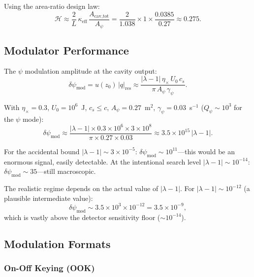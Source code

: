 \documentclass[11pt,letterpaper]{article}
\newcommand{\ee}[1]{\times 10^{#1}}
\newcommand{\psifield}{\psi}
\begin{document}
Using the area-ratio design law:
\begin{equation}
\mathcal{H} \approx \frac{2}{L}\,\kappa_\text{eff}\,
\frac{A_\text{cav,tot}}{A_\psi}
= \frac{2}{1.038}\times 1 \times \frac{0.0385}{0.27}
\approx 0.275.
\label{eq:H_value}
\end{equation}

\subsection{Modulator Performance}

The $\psifield$ modulation amplitude at the cavity output:
\begin{equation}
\delta\psifield_\text{mod} = u(z_0)\,|q|_\text{res}
\approx \frac{|\lambda-1|\,\eta_\times\,U_0\,c_s}
{\pi\,A_\psi\,\gamma_\psi}.
\label{eq:dpsi_mod}
\end{equation}

With $\eta_\times = 0.3$, $U_0 = 10^6$~J, $c_s \leq c$,
$A_\psi = 0.27$~m$^2$, $\gamma_\psi = 0.03$~s$^{-1}$
($Q_\psi \sim 10^3$ for the $\psifield$ mode):
\begin{equation}
\delta\psifield_\text{mod} \approx
\frac{|\lambda-1|\times 0.3\times 10^6\times 3\ee{8}}
{\pi\times 0.27\times 0.03}
\approx 3.5\ee{15}\,|\lambda-1|.
\label{eq:dpsi_numerical}
\end{equation}

For the accidental bound $|\lambda-1| \sim 3\ee{-5}$:
$\delta\psifield_\text{mod} \sim 10^{11}$---this would be an
enormous signal, easily detectable. At the intentional search
level $|\lambda-1| \sim 10^{-14}$:
$\delta\psifield_\text{mod} \sim 35$---still macroscopic.

The realistic regime depends on the actual value of $|\lambda-1|$.
For $|\lambda-1| \sim 10^{-12}$ (a plausible intermediate value):
\begin{equation}
\delta\psifield_\text{mod} \sim 3.5\ee{3} \times 10^{-12}
= 3.5\ee{-9},
\label{eq:dpsi_realistic}
\end{equation}
which is vastly above the detector sensitivity floor
($\sim 10^{-14}$).

\subsection{Modulation Formats}

\subsubsection{On-Off Keying (OOK)}
\end{document}
